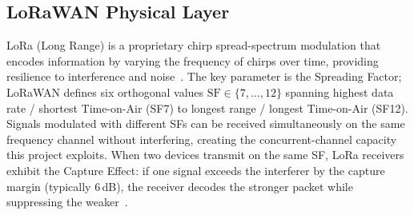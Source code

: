 \subsection{LoRaWAN Physical Layer}

LoRa (Long Range) is a proprietary chirp spread-spectrum modulation
that encodes information by varying the frequency of chirps over
time, providing resilience to interference and
noise~\cite{augustin2016lora,bor2016lora}. The key parameter is the
Spreading Factor; LoRaWAN defines six orthogonal values
$\mathrm{SF}\in\{7,\ldots,12\}$ spanning highest data rate / shortest
Time-on-Air (SF7) to longest range / longest Time-on-Air (SF12).
Signals modulated with different SFs can be received simultaneously
on the same frequency channel without interfering, creating the
concurrent-channel capacity this project exploits. When two devices
transmit on the same SF, LoRa receivers exhibit the Capture Effect:
if one signal exceeds the interferer by the capture margin (typically
$6$\,dB), the receiver decodes the stronger packet while suppressing
the weaker~\cite{croce2020lora,zorbas2025revisiting}.
